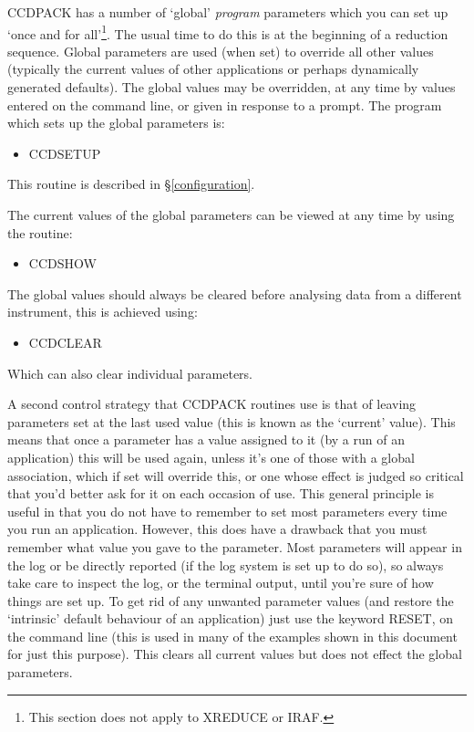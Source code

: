 \documentclass[twoside,11pt]{article}
\newcommand{\hyperref}[4]{#2\ref{#4}#3}
\newcommand{\htmlref}[2]{#1}
\renewcommand{\_}{\texttt{\symbol{95}}}
\newcommand{\routine}[1]{{\sc #1}}
\newcommand{\xroutine}[1]{\htmlref{{\sc #1}}{#1}}
\begin{document}
CCDPACK has a number of `global' {\em program\/} parameters which you
can set up `once and for all'\footnote{This section does not apply 
                                       to \routine{XREDUCE} or IRAF.}.
The usual time to do this is at the beginning of a
reduction sequence.
Global parameters are used (when set) to override all other values
(typically the current values of other applications or perhaps
dynamically generated defaults). The global values may be overridden,
at any time by values entered on the command line, or given in
response to a prompt. The program which sets up the global parameters is:
\begin{itemize}
\item \routine{CCDSETUP}
\end{itemize}

This routine is described \hyperref{elsewhere}{in \S}{}{configuration}.

The current values of the global parameters can be viewed at any time by
using the routine:
\begin{itemize}
\item \xroutine{CCDSHOW}
\end{itemize}

The global values should always be cleared before analysing data from a
different instrument, this is achieved using:
\begin{itemize}
\item \xroutine{CCDCLEAR}
\end{itemize}

Which can also clear individual parameters.

A second control strategy that CCDPACK routines use is that of leaving
parameters set at the last used value (this is known as the `current'
value).
This means that once a parameter has a value assigned to it (by a run
of an application) this will be used again, unless it's one of those
with a global association, which if set will override this, or one
whose effect is judged so critical that you'd better ask for it on
each occasion of use.
This general principle is useful in that you do not have to remember
to set most parameters every time you run an application.
However, this does have a drawback that you must remember what
value you gave to the parameter.
Most parameters will appear in the log or be directly reported (if
the log system is set up to do so), so always take care to inspect
the log, or the terminal output, until you're sure of how things
are set up.
To get rid of any unwanted parameter values (and restore the
`intrinsic' default behaviour of an application) just use the keyword
RESET, on the command line (this is used in many of the
examples shown in this document for just this purpose).
This clears all current values but does not effect the global
parameters.
\end{document}
